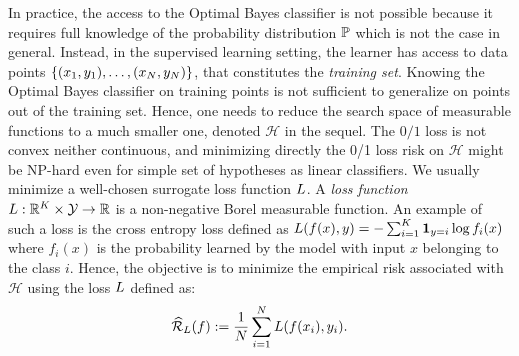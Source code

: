 In practice, the access to the Optimal Bayes  classifier is not possible because it requires full knowledge of the probability distribution $\mathbb{P}$ which is not the case in general. Instead, in the supervised learning setting, the learner has access to data points $\{(x_1,y_1),\dots,(x_N,y_N)\}$, that constitutes the \emph{training set}. Knowing the Optimal Bayes classifier on training points is not sufficient to generalize on points out of the training set. Hence, one needs to reduce the search space of measurable functions to a much smaller one, denoted $\mathcal{H}$ in the sequel. The $0/1$ loss is not convex neither continuous, and minimizing directly the 0/1 loss risk  on $\mathcal{H}$ might be NP-hard even for simple set of hypotheses as linear classifiers. We usually minimize a well-chosen surrogate loss function $L$. A \textit{loss function} $L:\mathbb{R}^K\times\mathcal{Y}\to\mathbb{R}$ is a non-negative Borel measurable function. An example of such a loss is the cross entropy loss defined as $L(f(x),y)=-\sum_{i=1}^K \mathbf{1}_{y=i}\log f_i(x)$
where $f_i(x)$ is the probability learned by the model with input $x$ belonging to the class $i$. Hence, the objective is to minimize the empirical risk associated with $\mathcal{H}$ using the loss $L$  defined as:
\begin{align*}
\widehat{\mathcal{R}}_{L}(f):= \frac{1}{N}\sum_{i=1}^N L(f(x_i),y_i).
\end{align*}



